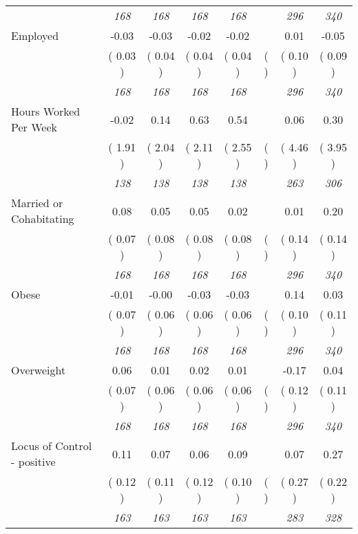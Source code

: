 \begin{tabular}{l c c c c c c c}
& \textit{ 168 } & \textit{ 168 } & \textit{ 168 } & \textit{ 168 } & & \textit{ 296 } & \textit{ 340 } \\
Employed &     -0.03 &     -0.03 &     -0.02 &     -0.02 & &      0.01 &     -0.05 \\
& (     0.03 ) & (     0.04 ) & (     0.04 ) & (     0.04 ) & ( ) & (     0.10 ) & (     0.09 ) \\
& \textit{ 168 } & \textit{ 168 } & \textit{ 168 } & \textit{ 168 } & & \textit{ 296 } & \textit{ 340 } \\
Hours Worked Per Week &     -0.02 &      0.14 &      0.63 &      0.54 & &      0.06 &      0.30 \\
& (     1.91 ) & (     2.04 ) & (     2.11 ) & (     2.55 ) & ( ) & (     4.46 ) & (     3.95 ) \\
& \textit{ 138 } & \textit{ 138 } & \textit{ 138 } & \textit{ 138 } & & \textit{ 263 } & \textit{ 306 } \\
Married or Cohabitating &      0.08 &      0.05 &      0.05 &      0.02 & &      0.01 &      0.20 \\
& (     0.07 ) & (     0.08 ) & (     0.08 ) & (     0.08 ) & ( ) & (     0.14 ) & (     0.14 ) \\
& \textit{ 168 } & \textit{ 168 } & \textit{ 168 } & \textit{ 168 } & & \textit{ 296 } & \textit{ 340 } \\
Obese &     -0.01 &     -0.00 &     -0.03 &     -0.03 & &      0.14 &      0.03 \\
& (     0.07 ) & (     0.06 ) & (     0.06 ) & (     0.06 ) & ( ) & (     0.10 ) & (     0.11 ) \\
& \textit{ 168 } & \textit{ 168 } & \textit{ 168 } & \textit{ 168 } & & \textit{ 296 } & \textit{ 340 } \\
Overweight &      0.06 &      0.01 &      0.02 &      0.01 & &     -0.17 &      0.04 \\
& (     0.07 ) & (     0.06 ) & (     0.06 ) & (     0.06 ) & ( ) & (     0.12 ) & (     0.11 ) \\
& \textit{ 168 } & \textit{ 168 } & \textit{ 168 } & \textit{ 168 } & & \textit{ 296 } & \textit{ 340 } \\
Locus of Control - positive &      0.11 &      0.07 &      0.06 &      0.09 & &      0.07 &      0.27 \\
& (     0.12 ) & (     0.11 ) & (     0.12 ) & (     0.10 ) & ( ) & (     0.27 ) & (     0.22 ) \\
& \textit{ 163 } & \textit{ 163 } & \textit{ 163 } & \textit{ 163 } & & \textit{ 283 } & \textit{ 328 } \\

\end{tabular}
